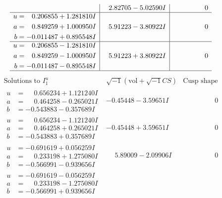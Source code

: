 \documentclass[1p]{elsarticle_modified}
\theoremstyle{definition}
\newcommand{\I}{\sqrt{-1}}
\begin{document}
$$\begin{array}{c|c|c}
 & \phantom{-}2.82705 - 5.02590 I & \phantom{-0.000000 } 0 \\ \hline\begin{aligned}
u &= \phantom{-}0.206855 + 1.281810 I \\
a &= \phantom{-}0.849259 + 1.000950 I \\
b &= -0.011487 + 0.895548 I\end{aligned}
 & \phantom{-}5.91223 - 3.80922 I & \phantom{-0.000000 } 0 \\ \hline\begin{aligned}
u &= \phantom{-}0.206855 - 1.281810 I \\
a &= \phantom{-}0.849259 - 1.000950 I \\
b &= -0.011487 - 0.895548 I\end{aligned}
 & \phantom{-}5.91223 + 3.80922 I & \phantom{-0.000000 } 0\\
 \hline 
 \end{array}$$\newpage$$\begin{array}{c|c|c}  
\text{Solutions to }I^u_{1}& \I (\text{vol} + \sqrt{-1}CS) & \text{Cusp shape}\\
 \hline 
\begin{aligned}
u &= \phantom{-}0.656234 + 1.121240 I \\
a &= \phantom{-}0.464258 - 0.265021 I \\
b &= -0.543883 - 0.357689 I\end{aligned}
 & -0.45448 - 3.59651 I & \phantom{-0.000000 } 0 \\ \hline\begin{aligned}
u &= \phantom{-}0.656234 - 1.121240 I \\
a &= \phantom{-}0.464258 + 0.265021 I \\
b &= -0.543883 + 0.357689 I\end{aligned}
 & -0.45448 + 3.59651 I & \phantom{-0.000000 } 0 \\ \hline\begin{aligned}
u &= -0.691619 + 0.056259 I \\
a &= \phantom{-}0.233198 + 1.275080 I \\
b &= -0.566991 - 0.939656 I\end{aligned}
 & \phantom{-}5.89009 - 2.09906 I & \phantom{-0.000000 } 0 \\ \hline\begin{aligned}
u &= -0.691619 - 0.056259 I \\
a &= \phantom{-}0.233198 - 1.275080 I \\
b &= -0.566991 + 0.939656 I\end{aligned}

\end{array}$$
\end{document}
